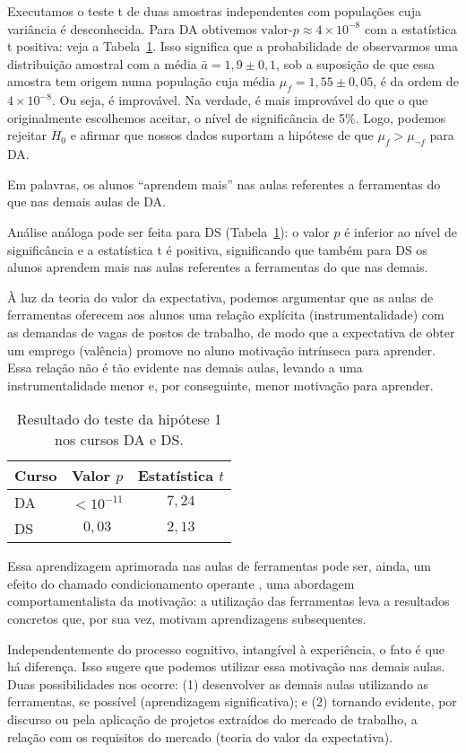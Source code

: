 Executamos o teste t de duas amostras independentes com populações cuja variância é desconhecida.
Para DA obtivemos $\text{valor-}p \approx 4\times10^{-8}$ com a estatística t positiva: veja a Tabela~\ref{tab:hipotese-1}.
Isso significa que a probabilidade de observarmos uma distribuição amostral com a média $\bar a = 1,9\pm 0,1$, sob a suposição de que essa amostra tem origem numa população cuja média $\mu_f = 1,55\pm 0,05$, é da ordem de $4\times10^{-8}$.
Ou seja, é improvável.
Na verdade, é mais improvável do que o que originalmente escolhemos aceitar, o nível de significância de 5\%.
Logo, podemos rejeitar $H_0$ e afirmar que nossos dados suportam a hipótese de que $\mu_{f} > \mu_{\neg f}$ para DA.

Em palavras, os alunos ``aprendem mais'' nas aulas referentes a ferramentas do que nas demais aulas de DA.


Análise análoga pode ser feita para DS (Tabela~\ref{tab:hipotese-1}): o valor $p$ é inferior ao nível de significância e a estatística t é positiva, significando que também para DS os alunos aprendem mais nas aulas referentes a ferramentas do que nas demais.

À luz da teoria do valor da expectativa, podemos argumentar que as aulas de ferramentas oferecem aos alunos uma relação explícita (instrumentalidade) com as demandas de vagas de postos de trabalho, de modo que a expectativa de obter um emprego (valência) promove no aluno motivação intrínseca para aprender.
Essa relação não é tão evidente nas demais aulas, levando a uma instrumentalidade menor e, por conseguinte, menor motivação para aprender.


\begin{table}
	\centering
	\caption{Resultado do teste da hipótese 1 nos cursos DA e DS.}
	\label{tab:hipotese-1}

	\begin{tabular}{lcc}
	\toprule
	Curso & Valor $p$   & Estatística $t$ \\
	\midrule
	DA    & $<10^{-11}$ & $7,24$ \\
	DS    & $0,03$      & $2,13$ \\ 
	\bottomrule
	\end{tabular}
\end{table}

Essa aprendizagem aprimorada nas aulas de ferramentas pode ser, ainda, um efeito do chamado condicionamento operante \cite{Petri}, uma abordagem comportamentalista da motivação: a utilização das ferramentas leva a resultados concretos que, por sua vez, motivam aprendizagens subsequentes.

Independentemente do processo cognitivo, intangível à experiência, o fato é que há diferença.
Isso sugere que podemos utilizar essa motivação nas demais aulas.
Duas possibilidades nos ocorre: (1) desenvolver as demais aulas utilizando as ferramentas, se possível (aprendizagem significativa); e (2) tornando evidente, por discurso ou pela aplicação de projetos extraídos do mercado de trabalho, a relação com os requisitos do mercado (teoria do valor da expectativa).